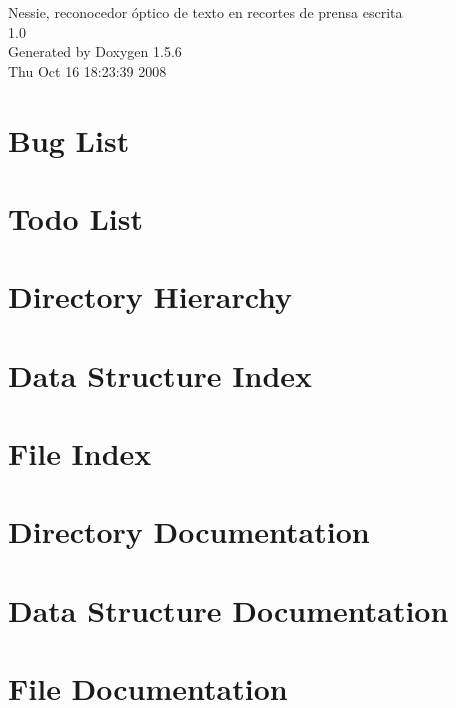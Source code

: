 \documentclass[a4paper]{book}
\begin{document}
\begin{titlepage}
\vspace*{7cm}
\begin{center}
{\Large Nessie, reconocedor óptico de texto en recortes de prensa escrita \\[1ex]\large 1.0 }\\
\vspace*{1cm}
{\large Generated by Doxygen 1.5.6}\\
\vspace*{0.5cm}
{\small Thu Oct 16 18:23:39 2008}\\
\end{center}
\end{titlepage}
\clearemptydoublepage
{}
\tableofcontents
\clearemptydoublepage
{}
\chapter{Bug List}
\label{bug}
\hypertarget{bug}{}

\chapter{Todo List}
\label{todo}
\hypertarget{todo}{}

\chapter{Directory Hierarchy}

\chapter{Data Structure Index}

\chapter{File Index}

\chapter{Directory Documentation}


\chapter{Data Structure Documentation}









\chapter{File Documentation}





















\printindex
\end{document}
